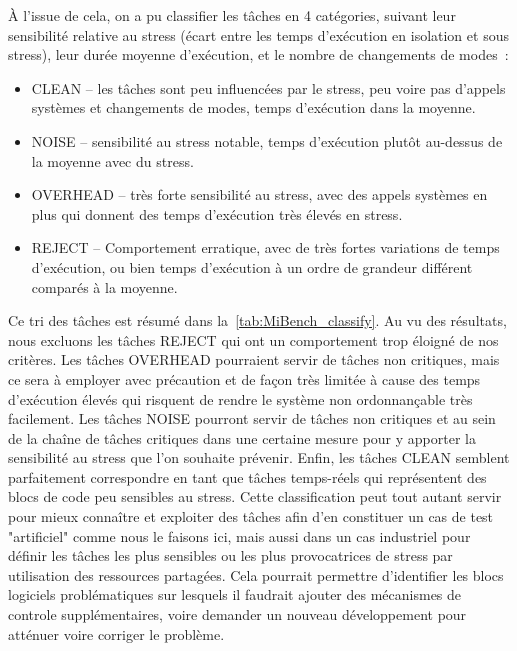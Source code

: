 \documentclass[french, a4paper, 11pt, twoside, pdftex]{StyleThese}
\begin{document}
À l'issue de cela, on a pu classifier les tâches en 4 catégories, suivant leur sensibilité relative au stress (écart entre les temps d'exécution en isolation et sous stress), leur durée moyenne d'exécution, et le nombre de changements de modes~: 
\begin{itemize}
	\item CLEAN -- les tâches sont peu influencées par le stress, peu voire pas d'appels systèmes et changements de modes, temps d'exécution dans la moyenne.
	\item NOISE -- sensibilité au stress notable, temps d'exécution plutôt au-dessus de la moyenne avec du stress.
	\item OVERHEAD -- très forte sensibilité au stress, avec des appels systèmes en plus qui donnent des temps d'exécution très élevés en stress.
	\item REJECT -- Comportement erratique, avec de très fortes variations de temps d'exécution, ou bien temps d'exécution à un ordre de grandeur différent comparés à la moyenne.
\end{itemize}
Ce tri des tâches est résumé dans la~\autoref{tab:MiBench_classify}. Au vu des résultats, nous excluons les tâches REJECT qui ont un comportement trop éloigné de nos critères. Les tâches OVERHEAD pourraient servir de tâches non critiques, mais ce sera à employer avec précaution et de façon très limitée à cause des temps d'exécution élevés qui risquent de rendre le système non ordonnançable très facilement. Les tâches NOISE pourront servir de tâches non critiques et au sein de la chaîne de tâches critiques dans une certaine mesure pour y apporter la sensibilité au stress que l'on souhaite prévenir. Enfin, les tâches CLEAN semblent parfaitement correspondre en tant que tâches temps-réels qui représentent des blocs de code peu sensibles au stress. Cette classification peut tout autant servir pour mieux connaître et exploiter des tâches afin d'en constituer un cas de test "artificiel" comme nous le faisons ici, mais aussi dans un cas industriel pour définir les tâches les plus sensibles ou les plus provocatrices de stress par utilisation des ressources partagées. Cela pourrait permettre d'identifier les blocs logiciels problématiques sur lesquels il faudrait ajouter des mécanismes de controle supplémentaires, voire demander un nouveau développement pour atténuer voire corriger le problème.
 \smallbreak 
 
\end{document}
